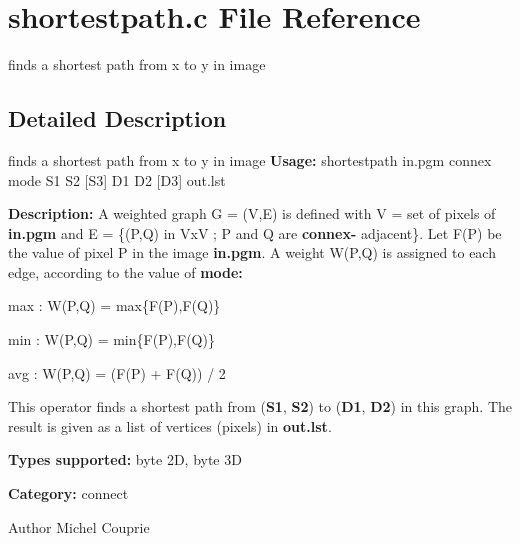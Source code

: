 \section{shortestpath.c File Reference}
\label{shortestpath_8c}


finds a shortest path from x to y in image  




\subsection{Detailed Description}
finds a shortest path from x to y in image {\bfseries Usage:} shortestpath in.pgm connex mode S1 S2 [S3] D1 D2 [D3] out.lst

{\bfseries Description:} A weighted graph G = (V,E) is defined with V = set of pixels of {\bfseries in.pgm} and E = \{(P,Q) in VxV ; P and Q are {\bfseries connex-\/} adjacent\}. Let F(P) be the value of pixel P in the image {\bfseries in.pgm}. A weight W(P,Q) is assigned to each edge, according to the value of {\bfseries mode:} 

\begin{DoxyItemize}
\item max : W(P,Q) = max\{F(P),F(Q)\} \item min : W(P,Q) = min\{F(P),F(Q)\} \item avg : W(P,Q) = (F(P) + F(Q)) / 2\end{DoxyItemize}
This operator finds a shortest path from ({\bfseries S1}, {\bfseries S2}) to ({\bfseries D1}, {\bfseries D2}) in this graph. The result is given as a list of vertices (pixels) in {\bfseries out.lst}.

{\bfseries Types supported:} byte 2D, byte 3D

{\bfseries Category:} connect

\begin{DoxyAuthor}{Author}
Michel Couprie 
\end{DoxyAuthor}
